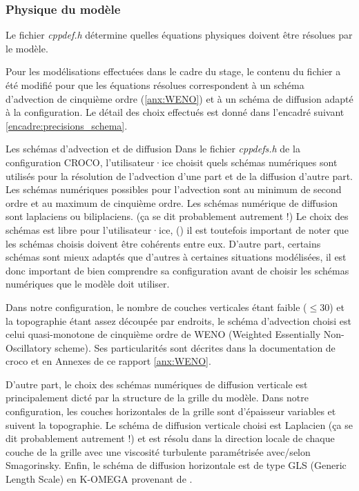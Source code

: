 \documentclass[10pt,a4paper,titlepage]{article}
\begin{document}
\subsubsection{Physique du modèle}
\label{subsub:pysique_modele}
Le fichier \textit{cppdef.h} détermine quelles équations physiques doivent être résolues par le modèle.

Pour les modélisations effectuées dans le cadre du stage, le contenu du fichier a été modifié pour que les équations résolues correspondent à un schéma d'advection de cinquième ordre (\ref{anx:WENO}) et à un schéma de diffusion adapté à la configuration.
Le détail des choix effectués est donné dans l'encadré suivant \ref{encadre:precisions_schema}.

\begin{codeEnv}{Les schémas d'advection et de diffusion\label{encadre:precisions_schema}}
    Dans le fichier \textit{cppdefs.h} de la configuration CROCO, l'utilisateur·ice choisit quels schémas numériques sont utilisés pour la résolution de l'advection d'une part et de la diffusion d'autre part.
    Les schémas numériques possibles pour l'advection sont au minimum de second ordre et au maximum de cinquième ordre.
    Les schémas numérique de diffusion sont laplaciens ou biliplaciens. (ça se dit probablement autrement !)
    Le choix des schémas est libre pour l'utilisateur·ice, (\cite{schemas_advection}) il est toutefois important de noter que les schémas choisis doivent être cohérents entre eux.
    D'autre part, certains schémas sont mieux adaptés que d'autres à certaines situations modélisées, il est donc important de bien comprendre sa configuration avant de choisir les schémas numériques que le modèle doit utiliser.
    
    Dans notre configuration, le nombre de couches verticales étant faible ($\leq 30$) et la topographie étant assez découpée par endroits, le schéma d'advection choisi est celui quasi-monotone de cinquième ordre de WENO (Weighted Essentially Non-Oscillatory scheme). 
    Ses particularités sont décrites dans la documentation de croco et en Annexes de ce rapport \ref{anx:WENO}.
    
    D'autre part, le choix des schémas numériques de diffusion verticale est principalement dicté par la structure de la grille du modèle.
    Dans notre configuration, les couches horizontales de la grille sont d'épaisseur variables et suivent la topographie.
    Le schéma de diffusion verticale choisi est Laplacien (ça se dit probablement autrement !) et est résolu dans la direction locale de chaque couche de la grille avec une viscosité turbulente paramétrisée avec/selon Smagorinsky.
    Enfin, le schéma de diffusion horizontale est de type GLS (Generic Length Scale) en K-OMEGA provenant de \cite{GLS_KOMEGA_kolmogorov1941equations}.
\end{codeEnv}
\end{document}
